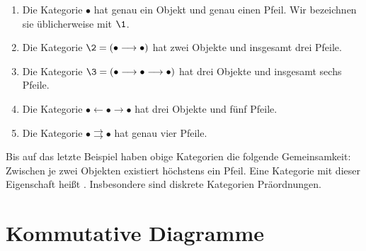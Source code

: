 \begin{example}
\begin{enumerate}
\item Die Kategorie $\bullet$ hat genau ein Objekt und genau einen Pfeil. Wir bezeichnen sie üblicherweise mit $\1$.
\item Die Kategorie $\2=(\bullet\longrightarrow\bullet)$ hat zwei Objekte und insgesamt drei Pfeile.
\item Die Kategorie $\3=(\bullet\longrightarrow\bullet\longrightarrow\bullet)$ hat drei Objekte und insgesamt sechs Pfeile.
\item Die Kategorie $\bullet\longleftarrow\bullet\longrightarrow\bullet$ hat drei Objekte und fünf Pfeile.
\item Die Kategorie $\bullet\rightrightarrows\bullet$ hat genau vier Pfeile.
\end{enumerate}
\end{example}

Bis auf das letzte Beispiel haben obige Kategorien die folgende Gemeinsamkeit: Zwischen je zwei Objekten existiert höchstens ein Pfeil. Eine Kategorie mit dieser Eigenschaft heißt . Insbesondere sind diskrete Kategorien Präordnungen.

\section{Kommutative Diagramme}
